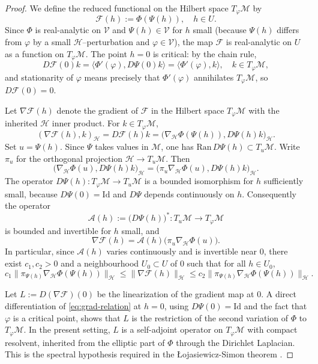 \documentclass[reqno]{amsart}
\begin{document}
\begin{proof}
We define the reduced functional on the Hilbert space $T_\varphi\mathcal M$ by
\[
\mathcal F(h):=\Phi(\Psi(h)),\quad h\in U.
\]
Since $\Phi$ is real-analytic on $\mathcal V$ and $\Psi(h)\in\mathcal V$ for $h$
small (because
$\Psi(h)$ differs from $\varphi$ by a small $\mathcal H$--perturbation and
$\varphi\in\mathcal V$),
the map $\mathcal F$ is real-analytic on $U$ as a function on $T_\varphi\mathcal M$.
The point $h=0$ is critical: by the chain rule,
\[
D\mathcal F(0)k
=\langle \Phi'(\varphi),D\Psi(0)k\rangle
=\langle \Phi'(\varphi),k\rangle,
\quad k\in T_\varphi\mathcal M,
\]
and stationarity of $\varphi$ means precisely that $\Phi'(\varphi)$ annihilates
$T_\varphi\mathcal M$, so $D\mathcal F(0)=0$.

Let $\nabla\mathcal F(h)$ denote the gradient of $\mathcal F$ in the Hilbert space
$T_\varphi\mathcal M$ with the inherited $\mathcal H$ inner product.
For $k\in T_\varphi\mathcal M$,
\[
(\nabla\mathcal F(h),k)_{\mathcal H}=D\mathcal F(h)k
=\bigl(\nabla_{\mathcal H}\Phi(\Psi(h)),D\Psi(h)k\bigr)_{\mathcal H}.
\]
Set $u=\Psi(h)$. Since $\Psi$ takes values in $\mathcal M$, one has
$\mathrm{Ran}\,D\Psi(h)\subset T_u\mathcal M$.
Write $\pi_u$ for the orthogonal projection $\mathcal H\to T_u\mathcal M$. Then
\[
\bigl(\nabla_{\mathcal H}\Phi(u),D\Psi(h)k\bigr)_{\mathcal H}
=\bigl(\pi_u\nabla_{\mathcal H}\Phi(u),D\Psi(h)k\bigr)_{\mathcal H}.
\]
The operator $D\Psi(h):T_\varphi\mathcal M\to T_u\mathcal M$ is a bounded isomorphism
for $h$ sufficiently small, because $D\Psi(0)=\mathrm{Id}$ and $D\Psi$ depends
continuously on $h$. Consequently the operator
\[
\mathcal A(h):=\bigl(D\Psi(h)\bigr)^{\!*}:T_u\mathcal M\to T_\varphi\mathcal M
\]
is bounded and invertible for $h$ small, and
\begin{equation}\label{eq:grad-relation}
\nabla\mathcal F(h)=\mathcal A(h)\bigl(\pi_u\nabla_{\mathcal H}\Phi(u)\bigr).
\end{equation}
In particular, since $\mathcal A(h)$ varies continuously and is invertible near $0$,
there exist $c_1,c_2>0$ and a neighbourhood $U_0\subset U$ of $0$ such that for all
$h\in U_0$,
\begin{equation}\label{eq:norm-equivalence}
c_1\|\pi_{\Psi(h)}\nabla_{\mathcal H}\Phi(\Psi(h))\|_{\mathcal H}
\le \|\nabla\mathcal F(h)\|_{\mathcal H}
\le c_2\|\pi_{\Psi(h)}\nabla_{\mathcal H}\Phi(\Psi(h))\|_{\mathcal H}.
\end{equation}

Let $L:=D(\nabla\mathcal F)(0)$ be the linearization of the gradient map at $0$. A direct
differentiation of \eqref{eq:grad-relation} at $h=0$, using $D\Psi(0)=\mathrm{Id}$ and
the fact that $\varphi$ is a critical point, shows that $L$ is the restriction of the
second variation of $\Phi$ to $T_\varphi\mathcal M$. In the present setting, $L$ is a
self-adjoint operator on $T_\varphi\mathcal M$ with compact resolvent, inherited from
the elliptic part of $\Phi$ through
the Dirichlet Laplacian. This is the spectral hypothesis required in the
\L{o}jasiewicz-Simon theorem \cite{Simon}.


\end{proof}
\end{document}
